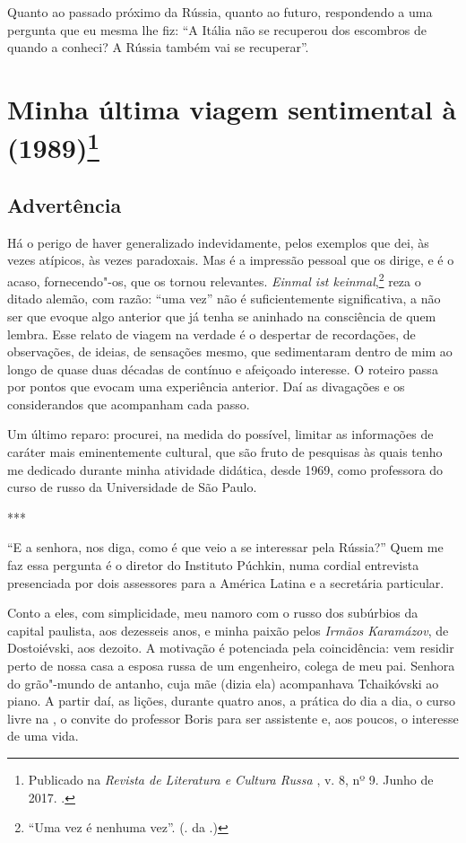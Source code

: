Quanto ao passado próximo da Rússia, quanto ao futuro, respondendo a uma
pergunta que eu mesma lhe fiz: ``A Itália não se recuperou dos escombros
de quando a conheci? A Rússia também vai se recuperar''.


\chapter{Minha última viagem sentimental à \protect{} (1989)\footnote{Publicado na \emph{Revista de Literatura e Cultura Russa \protect{}}, v. 8, nº 9. Junho de 2017. \protect{}.}}
\label{urss}

\section{\uppercase{A}dvertência}

Há o perigo de haver generalizado indevidamente, pelos exemplos que dei, às vezes atípicos, às vezes paradoxais. Mas é a impressão pessoal que os dirige, e é o acaso, fornecendo"-os, que os tornou relevantes. \emph{Einmal ist keinmal},\footnote{``Uma vez é nenhuma vez''. (. da .)} reza o ditado alemão, com razão: ``uma vez'' não é suficientemente significativa, a não ser que evoque algo anterior que já tenha se aninhado na consciência de quem lembra. Esse relato de viagem na verdade é o despertar de recordações, de observações, de ideias, de sensações mesmo, que sedimentaram dentro de mim ao longo de quase duas décadas de contínuo e afeiçoado interesse. O roteiro passa por pontos que evocam uma experiência anterior. Daí as divagações e os considerandos que acompanham cada passo.

Um último reparo: procurei, na medida do possível, limitar as informações de caráter mais eminentemente cultural, que são fruto de pesquisas às quais tenho me dedicado durante minha atividade didática, desde 1969, como professora do curso de russo da Universidade de São Paulo.

\begin{center}
***
\end{center}

``E a senhora, nos diga, como é que veio a se interessar pela Rússia?'' Quem me faz essa pergunta é o diretor do Instituto Púchkin, numa cordial entrevista presenciada por dois assessores para a América Latina e a secretária particular.

Conto a eles, com simplicidade, meu namoro com o russo dos subúrbios da capital paulista, aos dezesseis anos, e minha paixão pelos \emph{Irmãos Karamázov}, de Dostoiévski, aos dezoito. A motivação é potenciada pela coincidência: vem residir perto de nossa casa a esposa russa de um engenheiro, colega de meu pai. Senhora do grão"-mundo de antanho, cuja mãe (dizia ela) acompanhava Tchaikóvski ao piano. A partir daí, as lições, durante quatro anos, a prática do dia a dia, o curso livre na , o convite do professor Boris para ser assistente e, aos poucos, o interesse de uma vida.

